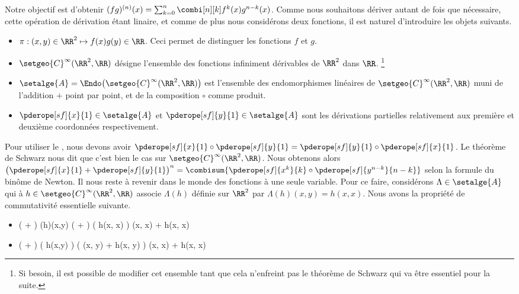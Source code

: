 Notre objectif est d'obtenir
$(fg)^{(n)} (x) = \sum_{k=0}^n \combi[n][k] f^k(x) g^{n-k}(x)$.
%
Comme nous souhaitons dériver autant de fois que nécessaire, cette opération de dérivation étant linaire,
et
comme de plus nous considérons deux fonctions,
il est naturel d'introduire les objets suivants.
%
\begin{itemize}
	\item $\pi: (x,y) \in \RR^2 \mapsto f(x) g(y) \in \RR$. Ceci permet de distinguer les fonctions $f$ et $g$.

	\item $\setgeo{C}^{\infty}(\RR^2 , \RR)$ désigne l'ensemble des fonctions infiniment dérivables de $\RR^2$ dans $\RR$.%
	\footnote{
		Si besoin, il est possible de modifier cet ensemble tant que cela n'enfreint pas le théorème de Schwarz qui va être essentiel pour la suite.
	}

	\item $\setalge{A} = \Endo \big( \setgeo{C}^{\infty}(\RR^2 , \RR) \big)$ est l'ensemble des endomorphismes linéaires de $\setgeo{C}^{\infty}(\RR^2 , \RR)$ muni de l'addition $+$ point par point, et de la composition $\circ$ comme produit.

	\item $\pderope[sf]{x}{1} \in \setalge{A}$ et $\pderope[sf]{y}{1} \in \setalge{A}$ sont les dérivations partielles relativement aux première et deuxième coordonnées respectivement. 
\end{itemize}


Pour utiliser le , nous devons avoir $\pderope[sf]{x}{1} \circ \pderope[sf]{y}{1} = \pderope[sf]{y}{1} \circ \pderope[sf]{x}{1}$. Le théorème de Schwarz nous dit que c'est bien le cas sur $\setgeo{C}^{\infty}(\RR^2 , \RR)$.
%
Nous obtenons alors
$\big( \pderope[sf]{x}{1} + \pderope[sf]{y}{1} \big)^n = \combisum{ \pderope[sf]{x^k}{k} \circ \pderope[sf]{y^{n-k}}{n-k}}$
selon la formule du binôme de Newton.
%
Il nous reste à revenir dans le monde des fonctions à une seule variable. Pour ce faire, considérons $\Lambda \in \setalge{A}$ qui à $h \in \setgeo{C}^{\infty}(\RR^2 , \RR)$ associe $\Lambda(h)$ définie sur $\RR^2$ par $\Lambda(h)(x,y) = h(x, x)$.
%
Nous avons la propriété de commutativité essentielle suivante.
%
\begin{itemize}
	\item
	\begin{stepcalc}[style=sar]
		\big(  +  \big) \circ \Lambda(h)(x,y)
	\explnext{}
		\big(  +  \big) \big( h(x, x) \big)
	\explnext{}
		(x, x) + h(x, x)
	\end{stepcalc}


	\item
	\begin{stepcalc}[style=sar]
		\Lambda \circ \big(  +  \big) \big( h(x,y) \big)
	\explnext{}
		\Lambda \big( (x, y) + h(x, y) \big)
	\explnext{}
		(x, x) + h(x, x)
	\end{stepcalc}
\end{itemize}


